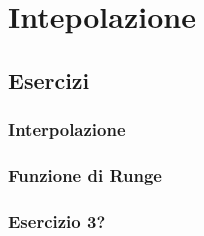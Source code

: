\setchapterpreamble[u]{\margintoc}
\chapter{Intepolazione}

\section{Esercizi}

\subsection{Interpolazione}

\subsection{Funzione di Runge}

\subsection{Esercizio 3?}
